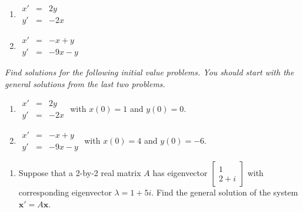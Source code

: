 \documentclass[10pt]{article}
\begin{document}
\begin{multicols}{2}
\begin{enumerate}
\setcounter{enumi}{\theenumCount}

\item $\begin{array}{ccc} x' & = & 2y \\ y' & = & -2x \end{array}$

\item $\begin{array}{ccc} x' & = & -x + y \\ y' & = & -9x - y \end{array}$

\setcounter{enumCount}{\theenumi}
\end{enumerate} 
\end{multicols}
\vfill
\vfill

\noindent
\textit{Find solutions for the following initial value problems. You should start with the general solutions from the last two problems. }

\begin{multicols}{2}
\begin{enumerate}
\setcounter{enumi}{\theenumCount}

\item $\begin{array}{ccc} x' & = & 2y \\ y' & = & -2x \end{array}$ with $x(0) = 1$ and $y(0) = 0$. 

\item $\begin{array}{ccc} x' & = & -x + y \\ y' & = & -9x - y \end{array}$ with $x(0) = 4$ and $y(0) = -6$. 

\setcounter{enumCount}{\theenumi}
\end{enumerate} 
\end{multicols}
\vfill
\vfill

\begin{enumerate}
\setcounter{enumi}{\theenumCount}
\item Suppose that a 2-by-2 real matrix $A$ has eigenvector $\begin{bmatrix} 1 \\ 2 + i \end{bmatrix}$ with corresponding eigenvector $\lambda = 1 + 5i$. Find the general solution of the system $\mathbf{x}' = A \mathbf{x}$. 
\vfill
\vfill

\setcounter{enumCount}{\theenumi}
\end{enumerate} 
\end{document}
